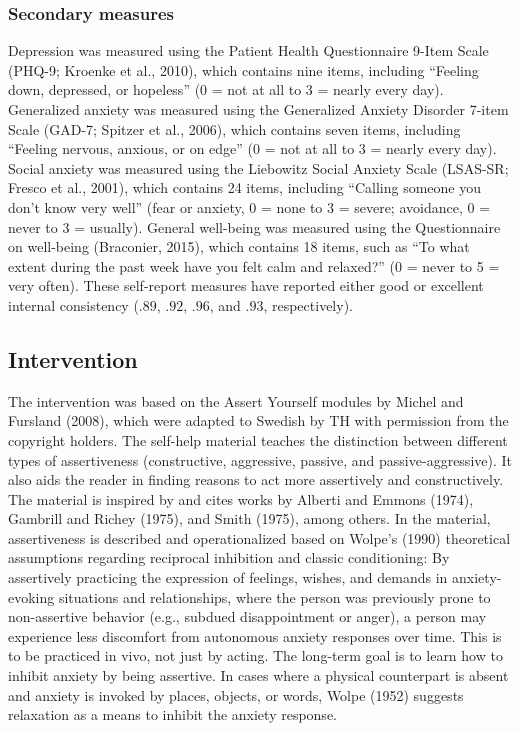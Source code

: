 \documentclass[3p]{elsarticle} %
\begin{document}
\hypertarget{secondary-measures}{%
\subsubsection{Secondary measures}\label{secondary-measures}}

Depression was measured using the Patient Health Questionnaire 9-Item
Scale (PHQ-9; Kroenke et al., 2010), which contains nine items,
including ``Feeling down, depressed, or hopeless'' (0 = not at all to 3
= nearly every day). Generalized anxiety was measured using the
Generalized Anxiety Disorder 7-item Scale (GAD-7; Spitzer et al., 2006),
which contains seven items, including ``Feeling nervous, anxious, or on
edge'' (0 = not at all to 3 = nearly every day). Social anxiety was
measured using the Liebowitz Social Anxiety Scale (LSAS-SR; Fresco et
al., 2001), which contains 24 items, including ``Calling someone you
don't know very well'' (fear or anxiety, 0 = none to 3 = severe;
avoidance, 0 = never to 3 = usually). General well-being was measured
using the Questionnaire on well-being (Braconier, 2015), which contains
18 items, such as ``To what extent during the past week have you felt
calm and relaxed?'' (0 = never to 5 = very often). These self-report
measures have reported either good or excellent internal consistency
(\(.89\), \(.92\), \(.96\), and \(.93\), respectively).

\hypertarget{intervention}{%
\subsection{Intervention}\label{intervention}}

The intervention was based on the Assert Yourself modules by Michel and
Fursland (2008), which were adapted to Swedish by TH with permission
from the copyright holders. The self-help material teaches the
distinction between different types of assertiveness (constructive,
aggressive, passive, and passive-aggressive). It also aids the reader in
finding reasons to act more assertively and constructively. The material
is inspired by and cites works by Alberti and Emmons (1974), Gambrill
and Richey (1975), and Smith (1975), among others. In the material,
assertiveness is described and operationalized based on Wolpe's (1990)
theoretical assumptions regarding reciprocal inhibition and classic
conditioning: By assertively practicing the expression of feelings,
wishes, and demands in anxiety-evoking situations and relationships,
where the person was previously prone to non-assertive behavior (e.g.,
subdued disappointment or anger), a person may experience less
discomfort from autonomous anxiety responses over time. This is to be
practiced in vivo, not just by acting. The long-term goal is to learn
how to inhibit anxiety by being assertive. In cases where a physical
counterpart is absent and anxiety is invoked by places, objects, or
words, Wolpe (1952) suggests relaxation as a means to inhibit the
anxiety response.
\end{document}

